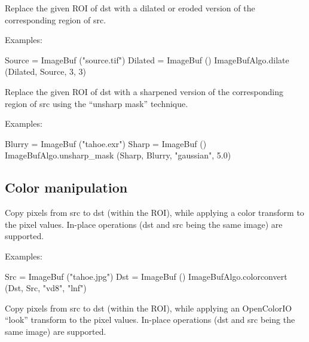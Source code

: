 Replace the given ROI of {\cf dst} with a dilated or eroded version of the
corresponding region of {\cf src}.

\smallskip
\noindent Examples:
\begin{code}
    Source = ImageBuf ("source.tif")
    Dilated = ImageBuf ()
    ImageBufAlgo.dilate (Dilated, Source, 3, 3)
\end{code}
\apiend


 

Replace the given ROI of {\cf dst} with a sharpened version of the
corresponding region of {\cf src} using the ``unsharp mask'' technique.

\smallskip
\noindent Examples:
\begin{code}
    Blurry = ImageBuf ("tahoe.exr")
    Sharp = ImageBuf ()
    ImageBufAlgo.unsharp_mask (Sharp, Blurry, "gaussian", 5.0)
\end{code}
\apiend



\subsection{Color manipulation}
\label{sec:iba:py:color}

 
Copy pixels from {\cf src} to {\cf dst} (within the ROI), while
applying a color transform to the pixel values.
In-place operations ({\cf dst} and {\cf src} being the same image)
are supported.

\smallskip
\noindent Examples:
\begin{code}
    Src = ImageBuf ("tahoe.jpg")
    Dst = ImageBuf ()
    ImageBufAlgo.colorconvert (Dst, Src, "vd8", "lnf")
\end{code}
\apiend


 
Copy pixels from {\cf src} to {\cf dst} (within the ROI), while
applying an OpenColorIO ``look'' transform to the pixel values.
In-place operations ({\cf dst} and {\cf src} being the same image)
are supported.

